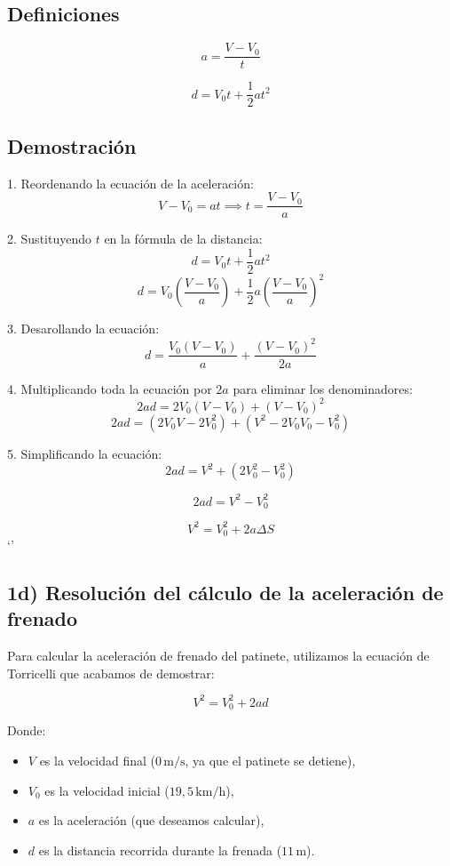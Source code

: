 \documentclass{article}
\begin{document}
\subsection*{Definiciones}

\[
a = \frac{V - V_0}{t}
\]

\[
d = V_0 t + \frac{1}{2} a t^2
\]

\subsection*{Demostración}

1. Reordenando la ecuación de la aceleración:
\[
V - V_0 = a t \implies t = \frac{V - V_0}{a}
\]

2. Sustituyendo \(t\) en la fórmula de la distancia:
\[
d = V_0 t + \frac{1}{2} a t^2
\]
\[
d = V_0 \left(\frac{V - V_0}{a}\right) + \frac{1}{2} a \left(\frac{V - V_0}{a}\right)^2
\]

3. Desarollando la ecuación:
\[
d = \frac{V_0 (V - V_0)}{a} + \frac{(V - V_0)^2}{2a}
\]

4. Multiplicando toda la ecuación por \(2a\) para eliminar los denominadores:
\[
2ad = 2V_0 (V - V_0) + (V - V_0)^2
\]
\[
2ad = (2V_0 V - 2V_0^2) + (V^2 - 2V_0 V_0 - V_0^2) 
\]

5. Simplificando la ecuación:
\[
2ad = V^2 + (2V_0^2 - V_0^2) 
\]

\[
2ad = V^2 - V_0^2
\]

\[
\boxed{ V^2=     V_0^2 + 2a\Delta S }
\]
`'









\subsection*{1d) Resolución del cálculo de la aceleración de frenado}

Para calcular la aceleración de frenado del patinete, utilizamos la ecuación de Torricelli que acabamos de demostrar:

\[
V^2 = V_0^2 + 2ad
\]

Donde:
\begin{itemize}
    \item \(V\) es la velocidad final (\(0 \, \text{m/s}\), ya que el patinete se detiene),
    \item \(V_0\) es la velocidad inicial (\(19,5 \, \text{km/h}\)),
    \item \(a\) es la aceleración (que deseamos calcular),
    \item \(d\) es la distancia recorrida durante la frenada (\(11 \, \text{m}\)).
\end{itemize}
\end{document}
